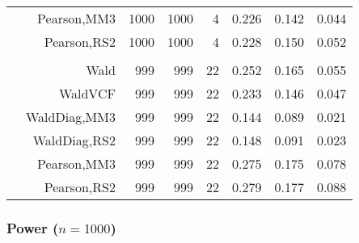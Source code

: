 \documentclass[
]{article}
\begin{document}
\begin{table}[H]
{\begin{tabular}[t]{lrrrrrrr}
\hspace{1em} & Pearson,MM3 & 1000 & 1000 & 4 & 0.226 & 0.142 & 0.044\\

\hspace{1em} & Pearson,RS2 & 1000 & 1000 & 4 & 0.228 & 0.150 & 0.052\\
\cmidrule{1-8}
\addlinespace[0.3em]
\multicolumn{8}{l}{\textbf{3F 15V}}\\
\hspace{1em} & Wald & 999 & 999 & 22 & 0.252 & 0.165 & 0.055\\

\hspace{1em} & WaldVCF & 999 & 999 & 22 & 0.233 & 0.146 & 0.047\\

\hspace{1em} & WaldDiag,MM3 & 999 & 999 & 22 & 0.144 & 0.089 & 0.021\\

\hspace{1em} & WaldDiag,RS2 & 999 & 999 & 22 & 0.148 & 0.091 & 0.023\\

\hspace{1em} & Pearson,MM3 & 999 & 999 & 22 & 0.275 & 0.175 & 0.078\\

\hspace{1em} & Pearson,RS2 & 999 & 999 & 22 & 0.279 & 0.177 & 0.088\\
\bottomrule
\end{tabular}}
\endgroup{}
\end{table}

\hypertarget{power-n1000}{%
\subsubsection{\texorpdfstring{Power
(\(n=1000\))}{Power (n=1000)}}\label{power-n1000}}
\end{document}
